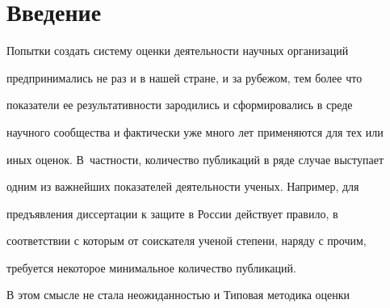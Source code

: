 












      \thispagestyle{headings}





      


            \label{st\stat}


            


            \vspace*{-9pt}





    


\section{Введение}


    


    Попытки создать систему оценки деятельности научных организаций 


предпринимались не раз и в нашей стране, и за рубежом, тем более что 


показатели ее результативности зародились и сформировались в среде 


научного сообщества и фактически уже много лет применяются для тех или 


иных оценок. В~частности, количество публикаций в ряде случае выступает 


одним из важнейших показателей деятельности ученых. Например, для 


предъявления диссертации к защите в России действует правило, в 


соответствии с которым от соискателя ученой степени, наряду с прочим, 


требуется некоторое минимальное количество публикаций.


    


    В этом смысле не стала неожиданностью и Типовая методика оценки 



